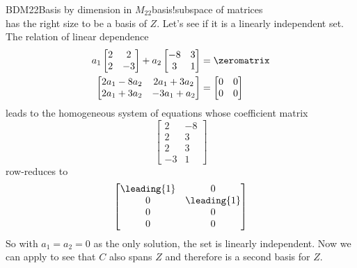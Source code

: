 \begin{example}{BDM22}{Basis by dimension in $M_{22}$}{basis!subspace of matrices}
\begin{equation*}
{}
\end{equation*}
%
has the right size to be a basis of $Z$.  Let's see if it is a linearly independent set.  The relation of linear dependence
%
\begin{align*}
a_1\begin{bmatrix}2&2\\2&-3\end{bmatrix}+
a_2\begin{bmatrix}-8&3\\3&1\end{bmatrix}&=\zeromatrix\\
\begin{bmatrix}2a_1-8a_2&2a_1+3a_2\\2a_1+3a_2&-3a_1+a_2\end{bmatrix}&=
\begin{bmatrix}0&0\\0&0\end{bmatrix}
\end{align*}
%
leads to the homogeneous system of equations whose coefficient matrix
%
\begin{equation*}
\begin{bmatrix}
2&-8\\
2&3\\
2&3\\
-3&1
\end{bmatrix}
\end{equation*}
%
row-reduces to 
%
\begin{equation*}
\begin{bmatrix}
\leading{1}&0\\
0&\leading{1}\\
0&0\\
0&0
\end{bmatrix}
\end{equation*}
%
So with $a_1=a_2=0$ as the only solution, the set is linearly independent.  Now we can apply  to see that $C$ also spans $Z$ and therefore is a second basis for $Z$.
%
\end{example}
%
%
